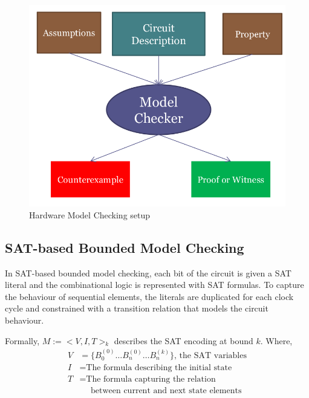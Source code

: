 \documentclass[letterpaper]{article} %
\begin{document}
\begin{figure}[H]
\begin{center}
  \includegraphics[scale=0.2]{hwmc.png}
  \caption{Hardware Model Checking setup}
  \label{hwmc}
\end{center}
\end{figure}

\subsection{SAT-based Bounded Model Checking}
In SAT-based bounded model checking, each bit of the circuit is given a SAT literal and the combinational logic is represented with SAT formulas. To capture the behaviour of sequential elements, the literals are duplicated for each clock cycle and constrained with a transition relation that models the circuit behaviour.

Formally, $M := <V, I, T>_k$ describes the SAT encoding at bound $k$. Where, 
\begin{equation*}
\begin{split}
V &= \{B_0^{(0)} \dots B_{n}^{(0)} \dots B_{n}^{(k)}\} \text{, the SAT variables} \\
I &= \text{The formula describing the initial state} \\
T &= \text{The formula capturing the relation} \\
&  \ \  \ \  \ \  \text{between current and next state elements}
\end{split}
\end{equation*}
\end{document}
